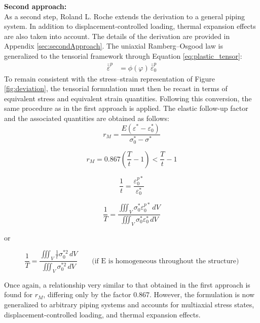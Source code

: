 \documentclass[10pt,a4paper]{article}
\begin{document}
\vspace{1cm}
\textbf{Second approach:} \\
As a second step, Roland L. Roche extends the derivation to a general piping system. In addition to displacement-controlled loading, thermal expansion effects are also taken into account. The details of the derivation are provided in Appendix \ref{sec:secondApproach}. The uniaxial Ramberg--Osgood law is generalized to the tensorial framework through Equation \eqref{eq:plastic_tensor}:
\begin{align*}
\bar{\bar\varepsilon}^p &= \phi(\varphi)\,\bar{\bar\varepsilon}_0^p
\end{align*}
To remain consistent with the stress--strain representation of Figure \ref{fig:deviation}, the tensorial formulation must then be recast in terms of equivalent stress and equivalent strain quantities. Following this conversion, the same procedure as in the first approach is applied. The elastic follow-up factor and the associated quantities are obtained as follows:
\begin{equation*}
r_M=\frac{E\left(\varepsilon^*-\varepsilon_0^*\right)}
{\sigma_0^*-\sigma^*}
\end{equation*}

\begin{equation*}
r_M = 0.867\left(\frac{T}{t}-1\right)
< \frac{T}{t}-1
\end{equation*}

\begin{equation*}
\frac{1}{t}=
\frac{\varepsilon_0^{p*}}
{\varepsilon_0^*}
\end{equation*}

\begin{equation*}
\frac{1}{T}
=
\frac{\iiint_V \sigma_0^* \varepsilon_0^{p*}\,dV}
{\iiint_V \sigma_0^* \varepsilon_0^*\,dV}
\end{equation*}

or

\begin{equation*}
\frac{1}{T} = \frac{\iiint_V \frac{1}{t}\sigma_0^{*2}\,dV}{\iiint_V \sigma_0^{*2}\,dV}    \ \ \ \ \ \ \ \ \ \text{(if E is homogeneous throughout the structure)}
\end{equation*}




Once again, a relationship very similar to that obtained in the first approach is found for \(r_M\), differing only by the factor 0.867. However, the formulation is now generalized to arbitrary piping systems and accounts for multiaxial stress states, displacement-controlled loading, and thermal expansion effects.
\end{document}
